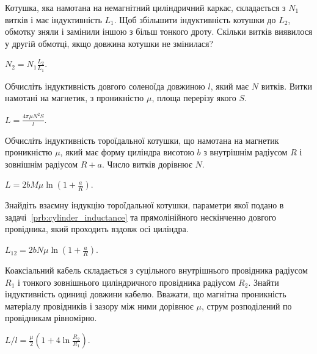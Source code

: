 \begin{problem}%
    Котушка, яка намотана на немагнітний циліндричний
каркас, складається з $N_1$ витків і має індуктивність $L_1$. Щоб
збільшити індуктивність котушки до $L_2$, обмотку зняли і
замінили іншою з більш тонкого дроту. Скільки витків
виявилося у другій обмотці, якщо довжина котушки не змінилася?
\begin{solution}
$N_2 = N_1 \frac{L_2}{L_1}$.
\end{solution}
\end{problem}


\begin{problem}
    Обчисліть індуктивність довгого соленоїда довжиною $l$, який має $N$ витків. Витки намотані на магнетик, з проникністю $\mu$, площа перерізу якого $S$.
\begin{solution}
	$L = \frac{4\pi\mu N^2 S}{l}$.
\end{solution}
\end{problem}

\begin{problem}\label{prb:cylinder_inductance}
    Обчисліть індуктивність тороїдальної котушки, що намотана на магнетик проникністю $\mu$, який має форму циліндра висотою $b$ з внутрішнім радіусом $R$ і зовнішнім радіусом $R + a$. Число витків дорівнює $N$.
\begin{solution}
	$L  = 2bM\mu\ln\left( 1 + \frac{a}{R}\right) $.
\end{solution}
\end{problem}

\begin{problem}
    Знайдіть взаємну індукцію тороїдальної котушки, параметри якої подано в задачі~\ref{prb:cylinder_inductance} та прямолінійного нескінченно довгого провідника, який проходить вздовж осі циліндра.
\begin{solution}
	$L_{12} = 2bN\mu \ln\left( 1 + \frac{a}{R}\right) $.
\end{solution}
\end{problem}

\begin{problem}%
Коаксіальний кабель складається з суцільного внутрішнього провідника радіусом $R_1$ і тонкого зовнішнього циліндричного провідника радіусом $R_2$. Знайти індуктивність одиниці довжини кабелю. Вважати, що магнітна проникність матеріалу провідників і зазору між ними дорівнює $\mu$, струм розподілений по провідникам рівномірно.
\begin{solution}
	$L/l = \frac{\mu}{2} \left( 1 + 4\ln\frac{R_2}{R_1}\right)$.
\end{solution}
\end{problem}

